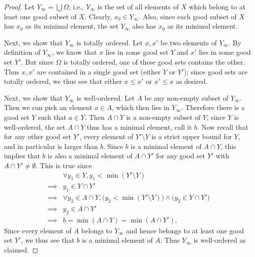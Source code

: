 \begin{proof}
  Let \(Y_{\infty} = \bigcup \Omega\), i.e., \(Y_{\infty}\) is the set of all elements of \(X\) which belong to at least one good subset of \(X\).
  Clearly, \(x_0 \in Y_{\infty}\).
  Also, since each good subset of \(X\) has \(x_0\) as its minimal element, the set \(Y_{\infty}\) also has \(x_0\) as its minimal element.

  Next, we show that \(Y_{\infty}\) is totally ordered.
  Let \(x, x'\) be two elements of \(Y_{\infty}\).
  By definition of \(Y_{\infty}\), we know that \(x\) lies in some good set \(Y\) and \(x'\) lies in some good set \(Y'\).
  But since \(\Omega\) is totally ordered, one of these good sets contains the other.
  Thus \(x, x'\) are contained in a single good set (either \(Y\) or \(Y'\));
  since good sets are totally ordered, we thus see that either \(x \leq x'\) or \(x' \leq x\) as desired.

  Next, we show that \(Y_{\infty}\) is well-ordered.
  Let \(A\) be any non-empty subset of \(Y_{\infty}\).
  Then we can pick an element \(a \in A\), which then lies in \(Y_{\infty}\).
  Therefore there is a good set \(Y\) such that \(a \in Y\).
  Then \(A \cap Y\) is a non-empty subset of \(Y\);
  since \(Y\) is well-ordered, the set \(A \cap Y\) thus has a minimal element, call it \(b\).
  Now recall that for any other good set \(Y'\), every element of \(Y' \setminus Y\) is a strict upper bound for \(Y\), and in particular is larger than \(b\).
  Since \(b\) is a minimal element of \(A \cap Y\), this implies that \(b\) is also a minimal element of \(A \cap Y'\) for any good set \(Y'\) with \(A \cap Y' \neq \emptyset\).
  This is true since
  \begin{align*}
             & \forall y_1 \in Y, y_1 < \min(Y' \setminus Y)                                                    \\
    \implies & y_1 \in Y \cap Y'                                                                                \\
    \implies & \forall y_2 \in A \cap Y, \big(y_2 < \min(Y' \setminus Y)\big) \land \big(y_2 \in Y \cap Y'\big) \\
    \implies & y_2 \in A \cap Y'                                                                                \\
    \implies & b = \min(A \cap Y) = \min(A \cap Y').
  \end{align*}
  Since every element of \(A\) belongs to \(Y_{\infty}\) and hence belongs to at least one good set \(Y'\), we thus see that \(b\) is a minimal element of \(A\).
  Thus \(Y_{\infty}\) is well-ordered as claimed.


\end{proof}
